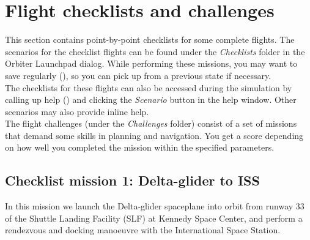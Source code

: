 \documentclass[Orbiter User Manual.tex]{subfiles}
\begin{document}
\section{Flight checklists and challenges}
This section contains point-by-point checklists for some complete flights. The scenarios for the checklist flights can be found under the \textit{Checklists} folder in the Orbiter Launchpad dialog. While performing these missions, you may want to save regularly (\Ctrl{}), so you can pick up from a previous state if necessary.\\
The checklists for these flights can also be accessed during the simulation by calling up help (\Alt{}) and clicking the \textit{Scenario} button in the help window. Other scenarios may also provide inline help.\\
The flight challenges (under the \textit{Challenges} folder) consist of a set of missions that demand some skills in planning and navigation. You get a score depending on how well you completed the mission within the specified parameters.

\subsection{Checklist mission 1: Delta-glider to ISS}
In this mission we launch the Delta-glider spaceplane into orbit from runway 33 of the Shuttle Landing Facility (SLF) at Kennedy Space Center, and perform a rendezvous and docking manoeuvre with the International Space Station.
\end{document}
